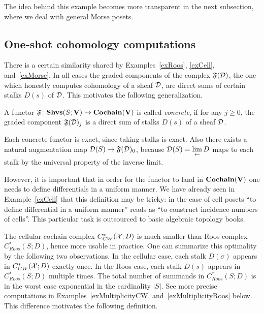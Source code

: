 The idea behind this example becomes more transparent in the next subsection, where we deal with general Morse posets.

\subsection{One-shot cohomology computations}\label{subsecMathOneShot}

There is a certain similarity shared by Examples~\ref{exRoos}, \ref{exCell}, and~\ref{exMorse}. In all cases the graded components of the complex $\mathfrak{F}(\mathcal{D})$, the one which honestly computes cohomology of a sheaf $\mathcal{D}$, are direct sums of certain stalks $D(s)$ of $\mathcal{D}$. This motivates the following generalization. %

\begin{defin}\label{definConcreteFunctor}
A functor $\mathfrak{F}\colon \mathbf{Shvs}(S;\mathbf{V})\to\mathbf{Cochain}(\mathbf{V})$ is called \emph{concrete}, if for any $j\geqslant 0$, the graded component $\mathfrak{F}(\mathcal{D})_j$ is a direct sum of stalks $D(s)$ of a sheaf $\mathcal{D}$.
\end{defin}

Each concrete functor is exact, since taking stalks is exact. Also there exists a natural augmentation map $\mathcal{D}(S)\to \mathfrak{F}(\mathcal{D})_0$, because $\mathcal{D}(S)=\lim\limits_{\leftarrow} D$ maps to each stalk by the universal property of the inverse limit.

However, it is important that in order for the functor to land in $\mathbf{Cochain}(\mathbf{V})$ one needs to define differentials in a uniform manner. We have already seen in Example~\ref{exCell} that this definition may be tricky: in the case of cell posets ``to define differential in a uniform manner'' reads as ``to construct incidence numbers of cells''. This particular task is outsourced to basic algebraic topology books.

The cellular cochain complex $C^*_{CW}(\mathcal{X};D)$ is much smaller than Roos complex $C^*_{Roos}(S;D)$, hence more usable in practice. One can summarize this optimality by the following two observations. In the cellular case, each stalk $D(\sigma)$ appears in $C^*_{CW}(\mathcal{X};D)$ exactly once. In the Roos case, each stalk $D(s)$ appears in $C^*_{Roos}(S;D)$ multiple times. The total number of summands in $C^*_{Roos}(S;D)$ is in the worst case exponential in the cardinality $|S|$. See more precise computations in Examples~\ref{exMultiplicityCW} and~\ref{exMultiplicityRoos} below. This difference motivates the following definition.

